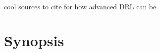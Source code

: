 \documentclass[../report.tex]{subfiles}
\begin{document}
cool sources to cite for how advanced DRL can be
\cite{drl_benchmarking, drl_atari, drl_humanlvl}

\section{Synopsis}

\end{document}
